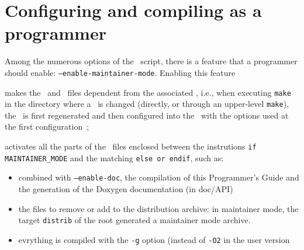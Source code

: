 \section{Configuring and compiling as a programmer}

Among the numerous options of the \configure\ script, there is a feature that
a programmer should enable: \texttt{--enable-maintainer-mode}. Enabling this feature
\begin{description}
\item{}makes the \make\ and \makein\ files dependent from the associated \makeam,
    i.e., when executing \texttt{make} in the directory where a \makeam\ is
    changed (directly, or through an upper-level \texttt{make}), the \makein\ is
    first regenerated and then configured into the \make\ with the options used
    at the first configuration~;
\item{}activates all the parts of the \makeam\ files enclosed between the
    instrutions \texttt{\footnotesize if MAINTAINER\_MODE} and the matching
    \texttt{\footnotesize else or endif}, such as:
    \begin{itemize}
    \item{combined with \texttt{--enable-doc}, the compilation of this
        Programmer's Guide and the generation of the Doxygen documentation (in
        doc/API)}
    \item{the files to remove or add to the distribution archive: in maintainer
        mode, the target \texttt{distrib} of the root \make generated a
        maintainer mode archive.}
    \item{evrything is compiled with the \texttt{-g} option (instead of
        \texttt{-O2} in the user version}
    \end{itemize}
\end{description}

